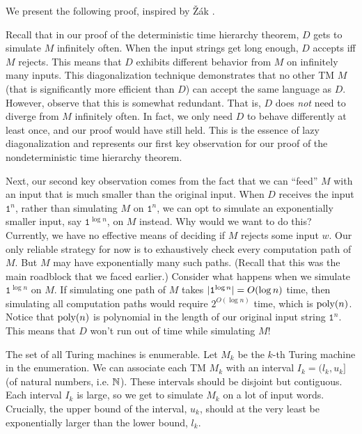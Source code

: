 \documentclass[11pt,twoside=off,numbers=noenddot]{scrbook}
\begin{document}
We present the following proof, inspired by Žák \cite{zak1983turing}.

\begin{proofidea}
  Recall that in our proof of the deterministic time hierarchy theorem, $D$ gets to simulate $M$ infinitely often. When the input strings get long enough, $D$ accepts iff $M$ rejects. This means that $D$ exhibits different behavior from $M$ on infinitely many inputs. This diagonalization technique demonstrates that no other TM $M$ (that is significantly more efficient than $D$) can accept the same language as $D$. However, observe that this is somewhat redundant. That is, $D$ does \emph{not} need to diverge from $M$ infinitely often. In fact, we only need $D$ to behave differently at least once, and our proof would have still held. This is the essence of lazy diagonalization and represents our first key observation for our proof of the nondeterministic time hierarchy theorem.

  Next, our second key observation comes from the fact that we can ``feed'' $M$ with an input that is much smaller than the original input. When $D$ receives the input $\texttt{1}^n$, rather than simulating $M$ on $\texttt{1}^n$, we can opt to simulate an exponentially smaller input, say $\texttt{1}^{\log n}$, on $M$ instead. Why would we want to do this? Currently, we have no effective means of deciding if $M$ rejects some input $w$. Our only reliable strategy for now is to exhaustively check every computation path of $M$. But $M$ may have exponentially many such paths. (Recall that this was the main roadblock that we faced earlier.) Consider what happens when we simulate $\texttt{1}^{\log n}$ on $M$. If simulating one path of $M$ takes $| \texttt{1}^{\log n} | = O(\log n)$ time, then simulating all computation paths would require $2^{O(\log n)}$ time, which is $\text{poly}(n)$. Notice that $\text{poly}(n)$ is polynomial in the length of our original input string $\texttt{1}^n$. This means that $D$ won't run out of time while simulating $M$!

  The set of all Turing machines is enumerable. Let $M_k$ be the $k$-th Turing machine in the enumeration. We can associate each TM $M_k$ with an interval $I_k = (l_k, u_k]$ (of natural numbers, i.e. $\mathbb N$). These intervals should be disjoint but contiguous. Each interval $I_k$ is large, so we get to simulate $M_k$ on a lot of input words. Crucially, the upper bound of the interval, $u_k$, should at the very least be exponentially larger than the lower bound, $l_k$.


\end{proofidea}
\end{document}
